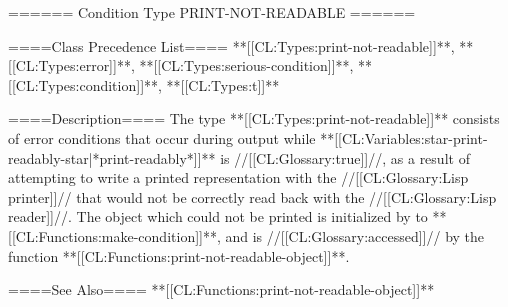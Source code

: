 ====== Condition Type PRINT-NOT-READABLE ======

====Class Precedence List==== **[[CL:Types:print-not-readable]]**, **[[CL:Types:error]]**, **[[CL:Types:serious-condition]]**, **[[CL:Types:condition]]**, **[[CL:Types:t]]**

====Description====
The type **[[CL:Types:print-not-readable]]** consists of error conditions that occur during output while **[[CL:Variables:star-print-readably-star|*print-readably*]]** is //[[CL:Glossary:true]]//, as a result of attempting to write a printed representation with the //[[CL:Glossary:Lisp printer]]// that would not be correctly read back with the //[[CL:Glossary:Lisp reader]]//. The object which could not be printed is initialized by  to **[[CL:Functions:make-condition]]**, and is //[[CL:Glossary:accessed]]// by the function **[[CL:Functions:print-not-readable-object]]**.

====See Also====
**[[CL:Functions:print-not-readable-object]]**


